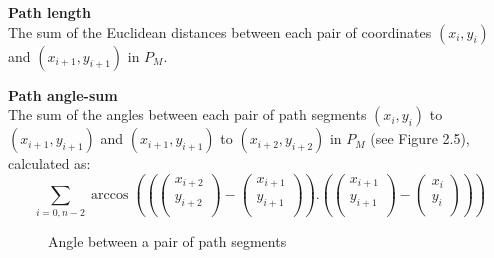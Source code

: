 \documentclass[12pt,notitlepage]{report}
\begin{document}
\begin{description}
\item{\bfseries Path length}\\
The sum of the Euclidean distances between each pair of coordinates $(x_{i},y_{i})$ and $(x_{i+1},y_{i+1})$ in $P_{M}$.
\item{\bfseries Path angle-sum}\\
The sum of the angles between each pair of path segments $(x_{i},y_{i})$ to $(x_{i+1},y_{i+1})$ and $(x_{i+1},y_{i+1})$ to $(x_{i+2},y_{i+2})$ in $P_{M}$ (see Figure 2.5), calculated as:
\begin{equation}
\sum\limits_{i=0, n-2} \arccos\left(\left(\left(\begin{array}{c}x_{i+2}\\y_{i+2}\\\end{array}\right) - \left(\begin{array}{c}x_{i+1}\\y_{i+1}\\\end{array}\right)\right).\left(\left(\begin{array}{c}x_{i+1}\\y_{i+1}\\\end{array}\right) - \left(\begin{array}{c}x_{i}\\y_{i}\\\end{array}\right)\right)\right)
\end{equation}
\end{description}

\begin{figure}
   \centering
    \caption{Angle between a pair of path segments}
  \end{figure}
\end{document}
